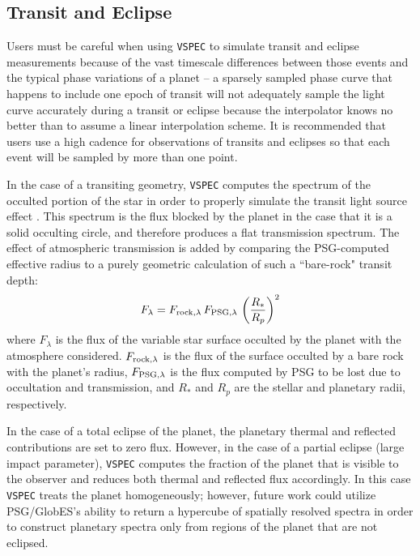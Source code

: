 \documentclass[linenumbers,5p,twocolumn,authoryear]{elsarticle}
\newcommand{\vspec}[1]{\texttt{VSPEC}#1}
\begin{document}
\subsection{Transit and Eclipse}
\label{subsec:transit}
Users must be careful when using \vspec{} to simulate transit and eclipse measurements because of the vast timescale differences between those events and the typical phase variations of a planet -- a sparsely sampled phase curve that happens to include one epoch of transit will not adequately sample the light curve accurately during a transit or eclipse because the interpolator knows no better than to assume a linear interpolation scheme. It is recommended that users use a high cadence for observations of transits and eclipses so that each event will be sampled by more than one point.

In the case of a transiting geometry, \vspec{} computes the spectrum of the occulted portion of the star in order to properly simulate the transit light source effect \citep[TLS][]{rackham2018}. This spectrum is the flux blocked by the planet in the case that it is a solid occulting circle, and therefore produces a flat transmission spectrum. The effect of atmospheric transmission is added by comparing the PSG-computed effective radius to a purely geometric calculation of such a ``bare-rock" transit depth:
\begin{equation}
    F_{\lambda} = F_{{\rm rock}, \lambda}\, F_{{\rm PSG,} \lambda} \,\left (\frac{R_*}{R_p} \right )^2
\end{equation}
where $F_\lambda$ is the flux of the variable star surface occulted by the planet with the atmosphere considered. $F_{{\rm rock}, \lambda}$ is the flux of the surface occulted by a bare rock with the planet's radius, $F_{{\rm PSG,} \lambda}$ is the flux computed by PSG to be lost
due to occultation and transmission, and $R_*$ and $R_p$ are the stellar and planetary radii, respectively.

In the case of a total eclipse of the planet, the planetary thermal and reflected contributions are set to zero flux. However, in the case of a partial eclipse (large impact parameter), \vspec{} computes the fraction of the planet that is visible to the observer and reduces both thermal and reflected flux accordingly. In this case \vspec{} treats the planet homogeneously; however, future work could utilize PSG/GlobES's ability to return a hypercube of spatially resolved spectra in order to construct planetary spectra only from regions of the planet that are not eclipsed.
\end{document}
